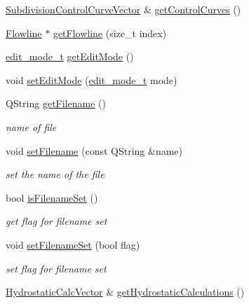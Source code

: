 \begin{DoxyCompactItemize}
\item 
\hyperlink{classShipCAD_1_1SubdivisionControlCurveVector}{Subdivision\-Control\-Curve\-Vector} \& \hyperlink{classShipCAD_1_1ShipCADModel_ac631aaf60a936bb5b22bcab59cb7d6a4}{get\-Control\-Curves} ()
\item 
\hyperlink{classShipCAD_1_1Flowline}{Flowline} $\ast$ \hyperlink{classShipCAD_1_1ShipCADModel_afc5654f671a17dd6672230648842975e}{get\-Flowline} (size\-\_\-t index)
\item 
\hyperlink{namespaceShipCAD_a66144e3f3a53da01f51c9bdb94fcae31}{edit\-\_\-mode\-\_\-t} \hyperlink{classShipCAD_1_1ShipCADModel_a355525c21cd0a9a4a88846b5587a236c}{get\-Edit\-Mode} ()
\item 
void \hyperlink{classShipCAD_1_1ShipCADModel_a2636160d900b8d8b00802ae78ee87925}{set\-Edit\-Mode} (\hyperlink{namespaceShipCAD_a66144e3f3a53da01f51c9bdb94fcae31}{edit\-\_\-mode\-\_\-t} mode)
\item 
Q\-String \hyperlink{classShipCAD_1_1ShipCADModel_a7cdd359f050f81975d1992a7d161ce87}{get\-Filename} ()
\begin{DoxyCompactList}\small\item\em name of file \end{DoxyCompactList}\item 
void \hyperlink{classShipCAD_1_1ShipCADModel_a07daf75d876f80296f841f5c8d2327cb}{set\-Filename} (const Q\-String \&name)
\begin{DoxyCompactList}\small\item\em set the name of the file \end{DoxyCompactList}\item 
bool \hyperlink{classShipCAD_1_1ShipCADModel_af63013461d2ef6ee7221d72a42949d7c}{is\-Filename\-Set} ()
\begin{DoxyCompactList}\small\item\em get flag for filename set \end{DoxyCompactList}\item 
void \hyperlink{classShipCAD_1_1ShipCADModel_a960f3e97ef2aa847c9bb7cdc7731cd39}{set\-Filename\-Set} (bool flag)
\begin{DoxyCompactList}\small\item\em set flag for filename set \end{DoxyCompactList}\item 
\hyperlink{classShipCAD_1_1HydrostaticCalcVector}{Hydrostatic\-Calc\-Vector} \& \hyperlink{classShipCAD_1_1ShipCADModel_aafc30dd7d6b9db4ccfc7bf1c4e2b3b11}{get\-Hydrostatic\-Calculations} ()
\item 

\end{DoxyCompactItemize}
